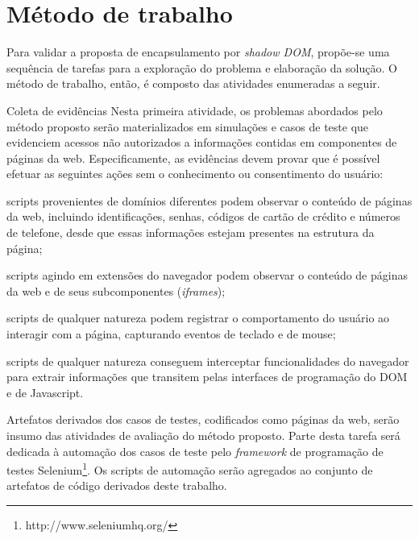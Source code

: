 \section{Método de trabalho}


Para validar a proposta de encapsulamento por \textit{shadow DOM}, propõe-se uma sequência de tarefas para a exploração do problema e elaboração da solução. O método de trabalho, então, é composto das atividades enumeradas a seguir.


\begin{alineas}
	\item Coleta de evidências
	Nesta primeira atividade, os problemas abordados pelo método proposto serão materializados em simulações e casos de teste que evidenciem acessos não autorizados a informações contidas em componentes de páginas da web. Especificamente, as evidências devem provar que é possível efetuar as seguintes ações sem o conhecimento ou consentimento do usuário:
	
	\begin{alineas}
		\item scripts provenientes de domínios diferentes podem observar o conteúdo de páginas da web, incluindo identificações, senhas, códigos de cartão de crédito e números de telefone, desde que essas informações estejam presentes na estrutura da página;
		\item scripts agindo em extensões do navegador podem observar o conteúdo de páginas da web e de seus subcomponentes (\textit{iframes});
		\item scripts de qualquer natureza podem registrar o comportamento do usuário ao interagir com a página, capturando eventos de teclado e de mouse;
		\item scripts de qualquer natureza conseguem interceptar funcionalidades do navegador para extrair informações que transitem pelas interfaces de programação do DOM e de Javascript.
	\end{alineas}
	
	Artefatos derivados dos casos de testes, codificados como páginas da web, serão insumo das atividades de avaliação do método proposto. Parte desta tarefa será dedicada à automação dos casos de teste pelo \textit{framework} de programação de testes Selenium\footnote{http://www.seleniumhq.org/}. Os scripts de automação serão agregados ao conjunto de artefatos de código derivados deste trabalho.
	

\end{alineas}
